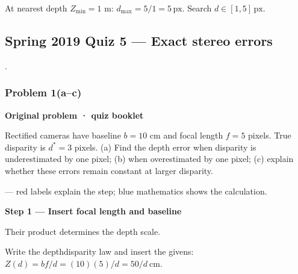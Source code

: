 \documentclass[letterpaper,11pt,english,openany,oneside]{jupyterBook}
\begin{document}
\sphinxAtStartPar
At nearest depth {\color{QuizMathBlue} \(Z_{\min}=1\)} m: {\color{QuizMathBlue} \(d_{\max}=5/1=\boxed{5\,\mathrm{px}}\)}. Search {\color{QuizMathBlue} \(\boxed{d\in[1,5]\,\mathrm{px}}\)}.

\par


\subsection{Spring 2019 Quiz 5 — Exact stereo errors}
\label{\detokenize{lectures/lecture04/quiz-workbook:spring-2019-quiz-5-exact-stereo-errors}}\label{\detokenize{lectures/lecture04/quiz-workbook:quiz-source-5}}
\sphinxAtStartPar
{} .


\subsubsection{Problem 1(a–c)}
\label{\detokenize{lectures/lecture04/quiz-workbook:problem-1-ac}}\label{\detokenize{lectures/lecture04/quiz-workbook:quiz-5-q1}}\label{\detokenize{lectures/lecture04/quiz-workbook:ex-lec04-stereo-spring}}
\par\medskip\textbf{Original problem · quiz booklet}\par\smallskip

\sphinxAtStartPar
Rectified cameras have baseline \(b=10\) cm and focal length \(f=5\) pixels. True disparity is \(d^*=3\) pixels. (a) Find the depth error when disparity is underestimated by one pixel; (b) when overestimated by one pixel; (c) explain whether these errors remain constant at larger disparity.

\par\medskip

\sphinxAtStartPar
{} — red labels explain the step; blue mathematics shows the calculation.

\par\medskip{}
{\color{QuizStepRed}\bfseries Step 1 — Insert focal length and baseline}\par\smallskip

\sphinxAtStartPar
{} Their product determines the depth scale.

\sphinxAtStartPar
Write the depth\sphinxhyphen{}disparity law and insert the givens: {\color{QuizMathBlue} \(Z(d)=bf/d=(10)(5)/d=50/d\ \mathrm{cm}\)}.
\end{document}
